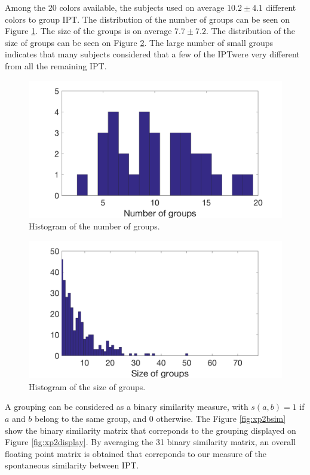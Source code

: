 \documentclass{article}
\newcommand{\ipt}{IPT}
\begin{document}
Among the 20 colors available, the subjects used on average $10.2 \pm  4.1$ different colors to group \ipt. The distribution of the number of groups can be seen on Figure \ref{fig:xp2nbGroup}. The size of the groups is on average $7.7 \pm   7.2$. The distribution of the size of groups can be seen on Figure \ref{fig:xp2sizeGroup}. The large number of small groups indicates that many subjects considered that a few of the \ipt were very different from all the remaining \ipt.

\begin{figure}
\center
\includegraphics[width = \textwidth]{figures/nbc.png}
\caption{Histogram of the number of groups.}
\label{fig:xp2nbGroup}
\end{figure}

\begin{figure}
\center
\includegraphics[width = \textwidth]{figures/sbc.png}
\caption{Histogram of the size of groups.}
\label{fig:xp2sizeGroup}
\end{figure}

A grouping can be considered as a binary similarity measure, with $s(a, b) = 1$ if $a$ and $b$ belong to the same group, and $0$ otherwise. The Figure \ref{fig:xp2bsim} show the binary similarity matrix that correponds to the grouping displayed on Figure \ref{fig:xp2display}. By averaging the 31 binary similarity matrix, an overall floating point matrix is obtained that correponds to our measure of the spontaneous similarity between \ipt.
\end{document}
